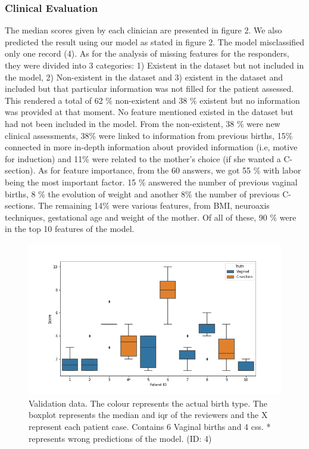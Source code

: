 \subsubsection{Clinical Evaluation}
The median scores given by each clinician are presented in figure 2. We also predicted the result using our model as stated in figure 2. The model misclassified only one record (4). As for the analysis of missing features for the responders, they were divided into 3 categories: 1) Existent in the dataset but not included in the model, 2) Non-existent in the dataset and 3) existent in the dataset and included but that particular information was not filled for the patient assessed. This rendered a total of 62 \% non-existent and 38 \% existent but no information was provided at that moment. No feature mentioned existed in the dataset but had not been included in the model. From the non-existent, 38 \% were new clinical assessments, 38\% were linked to information from previous births, 15\% connected in more in-depth information about provided information (i.e, motive for induction) and 11\% were related to the mother's choice (if she wanted a C-section). As for feature importance, from the 60 answers, we got 55 \% with labor being the most important factor. 15 \% answered the number of previous vaginal births, 8 \% the evolution of weight and another 8\% the number of previous C-sections. The remaining 14\% were various features, from BMI, neuroaxis techniques, gestational age and weight of the mother. Of all of these, 90 \% were in the top 10 features of the model.




\begin{figure}[htbp]
\centering
\captionsetup{justification=centering}
\caption[Obstetrics questionnaires data]{Validation data. The colour represents the actual birth type. The boxplot represents the median and \ac{iqr} of the reviewers and the X represent each patient case. Contains 6 Vaginal births and 4 \acp{cs}. * represents wrong predictions of the model. (ID: 4)}\label{fig:clinical} 
\includegraphics[scale=0.60]{figures/clinical_assessment.png}
\end{figure}




